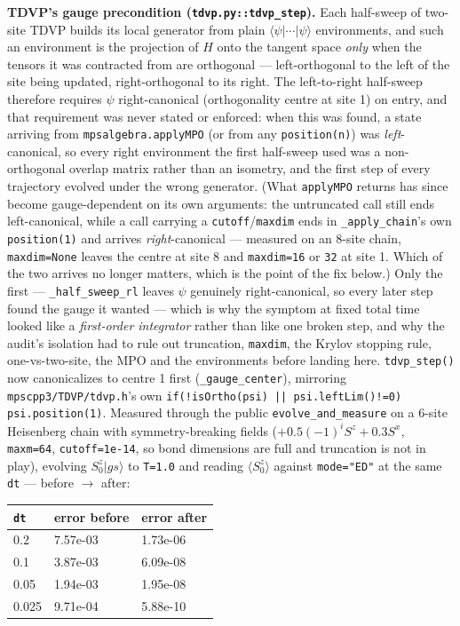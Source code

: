 \documentclass[11pt]{article}
\begin{document}
\textbf{TDVP's gauge precondition
(\texttt{tdvp.py::tdvp\_step}).} Each half-sweep of two-site TDVP builds
its local generator from plain $\langle\psi|\cdots|\psi\rangle$
environments, and such an environment is the projection of $H$ onto the
tangent space \emph{only} when the tensors it was contracted from are
orthogonal --- left-orthogonal to the left of the site being updated,
right-orthogonal to its right. The left-to-right half-sweep therefore
requires $\psi$ right-canonical (orthogonality centre at site 1) on
entry, and that requirement was never stated or enforced: when this was
found, a state arriving from \texttt{mpsalgebra.applyMPO} (or from any
\texttt{position(n)}) was \emph{left}-canonical, so every right
environment the first half-sweep used was a non-orthogonal overlap matrix
rather than an isometry, and the first step of every trajectory evolved
under the wrong generator. (What \texttt{applyMPO} returns has since
become gauge-dependent on its own arguments: the untruncated call still
ends left-canonical, while a call carrying a
\texttt{cutoff}/\texttt{maxdim} ends in \texttt{\_apply\_chain}'s own
\texttt{position(1)} and arrives \emph{right}-canonical --- measured on
an 8-site chain, \texttt{maxdim=None} leaves the centre at site 8 and
\texttt{maxdim=16} or \texttt{32} at site 1. Which of the two arrives no
longer matters, which is the point of the fix below.) Only the first ---
\texttt{\_half\_sweep\_rl} leaves $\psi$ genuinely right-canonical, so
every later step found the gauge it wanted --- which is why the symptom
at fixed total time looked like a \emph{first-order integrator} rather
than like one broken step, and why the audit's isolation had to rule out
truncation, \texttt{maxdim}, the Krylov stopping rule, one-vs-two-site,
the MPO and the environments before landing here.
\texttt{tdvp\_step()} now canonicalizes to centre 1 first
(\texttt{\_gauge\_center}), mirroring \texttt{mpscpp3/TDVP/tdvp.h}'s own
\texttt{if(!isOrtho(psi) || psi.leftLim()!=0) psi.position(1)}. Measured
through the public \texttt{evolve\_and\_measure} on a 6-site Heisenberg
chain with symmetry-breaking fields ($+0.5(-1)^iS^z + 0.3S^x$,
\texttt{maxm=64}, \texttt{cutoff=1e-14}, so bond dimensions are full and
truncation is not in play), evolving $S^z_0|gs\rangle$ to \texttt{T=1.0}
and reading $\langle S^z_0\rangle$ against \texttt{mode="ED"} at the same
\texttt{dt} --- before $\to$ after:

\begin{center}
\begin{tabular}{lll}
\hline
\texttt{dt} & error before & error after \\
\hline
0.2   & 7.57e-03 & 1.73e-06 \\
0.1   & 3.87e-03 & 6.09e-08 \\
0.05  & 1.94e-03 & 1.95e-08 \\
0.025 & 9.71e-04 & 5.88e-10 \\
\hline
\end{tabular}
\end{center}
\end{document}
